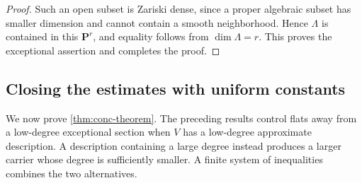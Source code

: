 \begin{proof}
Such an open subset is Zariski dense, since a proper algebraic subset has smaller dimension and cannot contain a smooth neighborhood.  Hence $\Lambda$ is contained in this $\mathbf{P}^r$, and equality follows from $\dim\Lambda=r$.  This proves the exceptional assertion and completes the proof.
\end{proof}


\subsection{Closing the estimates with uniform constants}
\label{subsec:conc-uniform-completion}

We now prove \cref{thm:conc-theorem}.  The preceding results control flats away from a low-degree exceptional section when $V$ has a low-degree approximate description.  A description containing a large degree instead produces a larger carrier whose degree is sufficiently smaller.  A finite system of inequalities combines the two alternatives.

